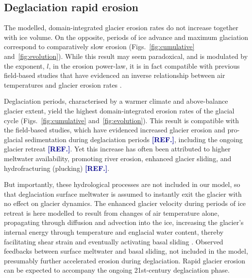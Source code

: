 \documentclass[utf8]{article}
\newcommand{\aref}[0]{\textcolor{darkblue}{\textbf{[REF.]}}}
\begin{document}
\subsection{Deglaciation rapid erosion}

    The modelled, domain-integrated glacier erosion rates do not increase
    together with ice volume. On the opposite, periods of ice advance and
    maximum glaciation correspond to comparatively slow erosion
    (Figs.~\ref{fig:cumulative} and~\ref{fig:evolution}). While this result may
    seem paradoxical, and is modulated by the exponent, $l$, in the erosion
    power-law, it is in fact compatible with previous field-based studies that
    have evidenced an inverse relationship between air temperatures and glacier
    erosion rates \citep{Koppes.etal.2015, Cook.etal.2020}.

    Deglaciation periods, characterised by a warmer climate and above-balance
    glacier extent, yield the highest domain-integrated erosion rates of the
    glacial cycle (Figs.~\ref{fig:cumulative} and~\ref{fig:evolution}). This
    result is compatible with the field-based studies, which have evidenced
    increased glacier erosion and pro-glacial sedimentation during deglaciation
    periods \aref, including the ongoing glacier retreat \aref. Yet this
    increase has often been attributed to higher meltwater availability,
    promoting river erosion, enhanced glacier sliding, and hydrofracturing
    (plucking) \aref.

    But importantly, these hydrological processes are not included in our
    model, so that deglaciation surface meltwater is assumed to instantly exit
    the glacier with no effect on glacier dynamics. The enhanced glacier
    velocity during periods of ice retreat is here modelled to result from
    changes of air temperature alone, propagating through diffusion and
    advection into the ice, increasing the glacier's internal energy through
    temperature and englacial water content, thereby facilitating shear strain
    and eventually activating basal sliding \citep[cf.][]{Aschwanden.etal.2012,
    Seguinot.etal.2016}. Observed feedbacks between surface meltwater and basal
    sliding, not included in the model, presumably further accelerated erosion
    during deglaciation. Rapid glacier erosion can be expected to accompany the
    ongoing 21st-century deglaciation phase.
\end{document}
